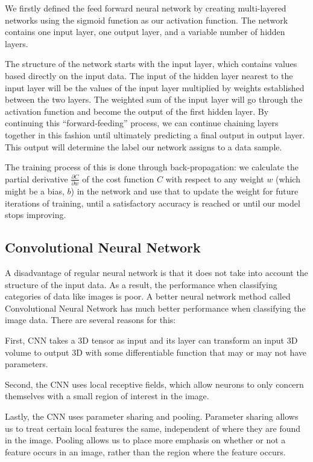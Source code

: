 \documentclass[conference]{IEEEtran}
\begin{document}
We firstly defined the feed forward neural network by creating multi-layered networks using the sigmoid function as our activation function. The network contains one input layer, one output layer, and a variable number of hidden layers. 

The structure of the network starts with the input layer, which contains values based directly on the input data. The input of the hidden layer nearest to the input layer will be the values of the input layer multiplied by weights established between the two layers. The weighted sum of the input layer will go through the activation function and become the output of the first hidden layer. By continuing this “forward-feeding” process, we can continue chaining layers together in this fashion until ultimately predicting a final output in output layer. This output will determine the label our network assigns to a data sample.

The training process of this is done through back-propagation: we calculate the partial derivative $\frac{\partial C}{\partial w}$ of the cost function $C$ with respect to any weight $w$ (which might be a bias, $b$) in the network and use that to update the weight for future iterations of training, until a satisfactory accuracy is reached or until our model stops improving. 

\subsection{Convolutional Neural Network}

A disadvantage of regular neural network is that it does not take into account the structure of the input data. As a result, the performance when classifying categories of data like images is poor. 
A better neural network method called Convolutional Neural Network has much better performance when classifying the image data. There are several reasons for this:

First, CNN takes a 3D tensor as input and its layer can transform an input 3D volume to output 3D with some differentiable function that may or may not have parameters. 

Second, the CNN uses local receptive fields, which allow neurons to only concern themselves with a small region of interest in the image. 

Lastly, the CNN uses parameter sharing and pooling. Parameter sharing allows us to treat certain local features the same, independent of where they are found in the image. Pooling allows us to place more emphasis on whether or not a feature occurs in an image, rather than the region where the feature occurs.
\end{document}
